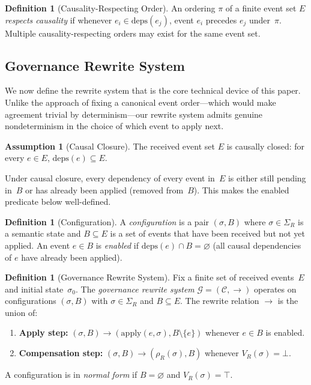 \documentclass[11pt,a4paper]{article}
\theoremstyle{plain}
\theoremstyle{definition}
\newtheorem{definition}[theorem]{Definition}
\newtheorem{assumption}[theorem]{Assumption}
\theoremstyle{remark}
\renewcommand{\_}{\textunderscore\allowbreak}
\begin{document}
\begin{definition}[Causality-Respecting Order]
\label{def:causal-order}
An ordering $\pi$ of a finite event set $E$ \emph{respects causality} if
whenever $e_i \in \mathrm{deps}(e_j)$, event $e_i$ precedes $e_j$
under~$\pi$.  Multiple causality-respecting orders may exist for the same
event set.
\end{definition}

\subsection{Governance Rewrite System}

We now define the rewrite system that is the core technical device of this
paper.  Unlike the approach of fixing a canonical event order---which would make
agreement trivial by determinism---our rewrite system admits genuine
nondeterminism in the choice of which event to apply next.

\begin{assumption}[Causal Closure]
\label{as:closure}
The received event set $E$ is causally closed: for every $e \in E$,
$\mathrm{deps}(e) \subseteq E$.
\end{assumption}

Under causal closure, every dependency of every event in~$E$ is either still
pending in~$B$ or has already been applied (removed from~$B$).  This makes the
enabled predicate below well-defined.

\begin{definition}[Configuration]
\label{def:config}
A \emph{configuration} is a pair $(\sigma, B)$ where $\sigma \in \Sigma_R$ is
a semantic state and $B \subseteq E$ is a set of events that have been
received but not yet applied.  An event $e \in B$ is \emph{enabled} if
$\mathrm{deps}(e) \cap B = \varnothing$ (all causal dependencies of $e$ have
already been applied).
\end{definition}

\begin{definition}[Governance Rewrite System]
\label{def:grs}
Fix a finite set of received events~$E$ and initial state~$\sigma_0$.  The
\emph{governance rewrite system} $\mathcal{G} = (\mathcal{C}, \to)$ operates
on configurations $(\sigma, B)$ with $\sigma \in \Sigma_R$ and
$B \subseteq E$.  The rewrite relation $\to$ is the union of:
\begin{enumerate}[leftmargin=*,nosep]
\item \textbf{Apply step:}
  $(\sigma, B) \to (\mathrm{apply}(e, \sigma), B \setminus \{e\})$ whenever
  $e \in B$ is enabled.
\item \textbf{Compensation step:}
  $(\sigma, B) \to (\rho_R(\sigma), B)$ whenever $V_R(\sigma) = \bot$.
\end{enumerate}
A configuration is in \emph{normal form} if $B = \varnothing$ and
$V_R(\sigma) = \top$.
\end{definition}
\end{document}
